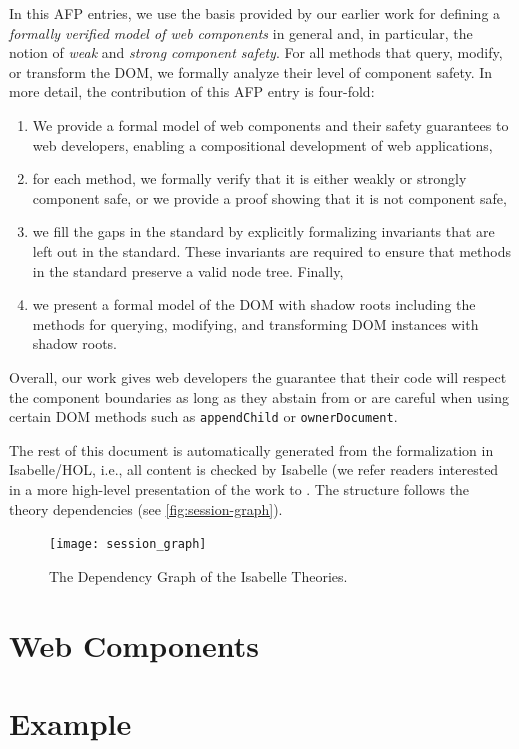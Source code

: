 \documentclass[10pt,DIV16,a4paper,abstract=true,twoside=semi,openright]
{scrreprt}
\begin{document}
In this AFP entries, we use the basis provided by our earlier work for
defining a \emph{formally verified model of web components} in general
and, in particular, the notion of \emph{weak} and \emph{strong
  component safety}. For all methods that query, modify, or transform
the DOM, we formally analyze their level of component safety. In more
detail, the contribution of this AFP entry is four-fold:
\begin{enumerate}
\item We provide a formal model of web components and their safety
  guarantees to web developers, enabling a compositional development
  of web applications,
\item for each method, we formally verify that it is either weakly or
  strongly component safe, or we provide a proof showing
  that it is not component safe,
\item we fill the gaps in the standard by explicitly formalizing
  invariants that are left out in the standard. These invariants are
  required to ensure that methods in the standard preserve a valid
  node tree. Finally,
\item we present a formal model of the DOM with shadow roots including
  the methods for querying, modifying, and transforming DOM instances
  with shadow roots.
\end{enumerate}
Overall, our work gives web developers the guarantee that their code
will respect the component boundaries as long as they abstain from or
are careful when using certain DOM methods such as
\texttt{appendChild} or \texttt{ownerDocument}.

The rest of this document is automatically generated from the
formalization in Isabelle/HOL, i.e., all content is checked by
Isabelle (we refer readers interested in a more high-level
presentation of the work to \cite{herzberg:web-components:2020,
  brucker.ea:web-components:2019}. The structure follows the theory
dependencies (see \autoref{fig:session-graph}).

\begin{figure}
  \centering
  \texttt{[image: session\_graph]}
  \caption{The Dependency Graph of the Isabelle Theories.\label{fig:session-graph}}
\end{figure}

\clearpage

\chapter{Web Components}
\label{cha:components}



\chapter{Example}
\label{cha:example}


{\small
  
  
}
\end{document}
